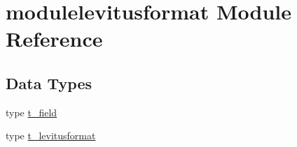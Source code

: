 \hypertarget{namespacemodulelevitusformat}{}\section{modulelevitusformat Module Reference}
\label{namespacemodulelevitusformat}
\subsection*{Data Types}
\begin{DoxyCompactItemize}
\item 
type \mbox{\hyperlink{structmodulelevitusformat_1_1t__field}{t\+\_\+field}}
\item 
type \mbox{\hyperlink{structmodulelevitusformat_1_1t__levitusformat}{t\+\_\+levitusformat}}
\end{DoxyCompactItemize}
